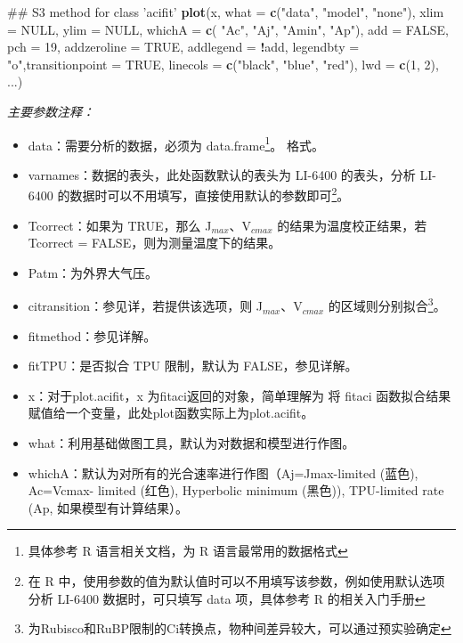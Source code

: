 \documentclass[]{krantz}
\makeatletter
\newenvironment{Shaded}{\begin{snugshade}}{\end{snugshade}}
\newcommand{\KeywordTok}[1]{\textcolor[rgb]{0.13,0.29,0.53}{\textbf{#1}}}
\newcommand{\DataTypeTok}[1]{\textcolor[rgb]{0.13,0.29,0.53}{#1}}
\newcommand{\DecValTok}[1]{\textcolor[rgb]{0.00,0.00,0.81}{#1}}
\newcommand{\StringTok}[1]{\textcolor[rgb]{0.31,0.60,0.02}{#1}}
\newcommand{\OtherTok}[1]{\textcolor[rgb]{0.56,0.35,0.01}{#1}}
\newcommand{\OperatorTok}[1]{\textcolor[rgb]{0.81,0.36,0.00}{\textbf{#1}}}
\newcommand{\NormalTok}[1]{#1}
\providecommand{\tightlist}{%
  \setlength{\itemsep}{0pt}\setlength{\parskip}{0pt}}
\newenvironment{kframe}{%
\medskip{}
\setlength{\fboxsep}{.8em}
 \def\at@end@of@kframe{}%
 \ifinner\ifhmode%
  \def\at@end@of@kframe{\end{minipage}}%
  \begin{minipage}{\columnwidth}%
 \fi\fi%
 \def\FrameCommand##1{\hskip\@totalleftmargin \hskip-\fboxsep
 \colorbox{shadecolor}{##1}\hskip-\fboxsep
     \hskip-\linewidth \hskip-\@totalleftmargin \hskip\columnwidth}%
 \MakeFramed {\advance\hsize-\width
   \@totalleftmargin\z@ \linewidth\hsize
   \@setminipage}}%
 {\par\unskip\endMakeFramed%
 \at@end@of@kframe}
\renewenvironment{Shaded}{\begin{kframe}}{\end{kframe}}
\theoremstyle{definition}
\theoremstyle{definition}
\theoremstyle{definition}
\theoremstyle{remark}
\makeatother
\begin{document}
\begin{Shaded}
\begin{Highlighting}[]
\NormalTok{## S3 method for class 'acifit'}
\KeywordTok{plot}\NormalTok{(x, }\DataTypeTok{what =} \KeywordTok{c}\NormalTok{(}\StringTok{"data"}\NormalTok{, }\StringTok{"model"}\NormalTok{, }\StringTok{"none"}\NormalTok{),}
     \DataTypeTok{xlim =} \OtherTok{NULL}\NormalTok{, }\DataTypeTok{ylim =} \OtherTok{NULL}\NormalTok{, }\DataTypeTok{whichA =} \KeywordTok{c}\NormalTok{(}
       \StringTok{"Ac"}\NormalTok{, }\StringTok{"Aj"}\NormalTok{, }\StringTok{"Amin"}\NormalTok{, }\StringTok{"Ap"}\NormalTok{), }\DataTypeTok{add =} \OtherTok{FALSE}\NormalTok{,}
\DataTypeTok{pch =} \DecValTok{19}\NormalTok{, }\DataTypeTok{addzeroline =} \OtherTok{TRUE}\NormalTok{, }\DataTypeTok{addlegend =} 
  \OperatorTok{!}\NormalTok{add, }\DataTypeTok{legendbty =} \StringTok{"o"}\NormalTok{,}\DataTypeTok{transitionpoint =} \OtherTok{TRUE}\NormalTok{, }
\DataTypeTok{linecols =} \KeywordTok{c}\NormalTok{(}\StringTok{"black"}\NormalTok{, }\StringTok{"blue"}\NormalTok{, }\StringTok{"red"}\NormalTok{), }\DataTypeTok{lwd =} \KeywordTok{c}\NormalTok{(}\DecValTok{1}\NormalTok{,}
\DecValTok{2}\NormalTok{), ...)}
\end{Highlighting}
\end{Shaded}

\emph{主要参数注释：}

\begin{itemize}
\tightlist
\item
  data：需要分析的数据，必须为 data.frame\footnote{具体参考 R
    语言相关文档，为 R 语言最常用的数据格式}。 格式。
\item
  varnames：数据的表头，此处函数默认的表头为 LI-6400 的表头，分析
  LI-6400 的数据时可以不用填写，直接使用默认的参数即可\footnote{在 R
    中，使用参数的值为默认值时可以不用填写该参数，例如使用默认选项分析
    LI-6400 数据时，可只填写 data 项，具体参考 R 的相关入门手册}。
\item
  Tcorrect：如果为 TRUE，那么 J\(_{max}\)、V\(_{cmax}\)
  的结果为温度校正结果，若 Tcorrect = FALSE，则为测量温度下的结果。
\item
  Patm：为外界大气压。
\item
  citransition：参见详，若提供该选项，则 J\(_{max}\)、V\(_{cmax}\)
  的区域则分别拟合\footnote{为Rubisco和RuBP限制的Ci转换点，物种间差异较大，可以通过预实验确定}。
\item
  fitmethod：参见详解。
\item
  fitTPU：是否拟合 TPU 限制，默认为 FALSE，参见详解。
\item
  x：对于plot.acifit，x 为fitaci返回的对象，简单理解为 将 fitaci
  函数拟合结果赋值给一个变量，此处plot函数实际上为plot.acifit。
\item
  what：利用基础做图工具，默认为对数据和模型进行作图。
\item
  whichA：默认为对所有的光合速率进行作图（Aj=Jmax-limited (蓝色),
  Ac=Vcmax- limited (红色), Hyperbolic minimum (黑色)), TPU-limited rate
  (Ap, 如果模型有计算结果）。
\end{itemize}
\end{document}
